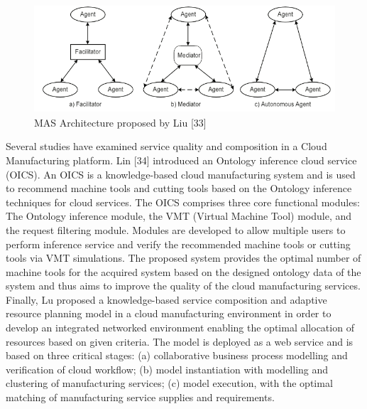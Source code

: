 \begin{figure}[h]
    \centering
    \includegraphics[height=4cm, keepaspectratio]{images/liu-mas-architecture}
    \caption{MAS Architecture proposed by Liu [33]}
    \label{fig:liu-mas-architecture}
\end{figure}

Several studies have examined service quality and composition in a Cloud Manufacturing platform. Lin [34] introduced an Ontology inference cloud service (OICS). An OICS is a knowledge-based cloud manufacturing system and is used to recommend machine tools and cutting tools based on the Ontology inference techniques for cloud services. The OICS comprises three core functional modules: The Ontology inference module, the VMT (Virtual Machine Tool) module, and the request filtering module. Modules are developed to allow multiple users to perform inference service and verify the recommended machine tools or cutting tools via VMT simulations. The proposed system provides the optimal number of machine tools for the acquired system based on the designed ontology data of the system and thus aims to improve the quality of the cloud manufacturing services.\\
Finally, Lu proposed a knowledge-based service composition and adaptive resource planning model in a cloud manufacturing environment in order to develop an integrated networked environment enabling the optimal allocation of resources based on given criteria. The model is deployed as a web service and is based on three critical stages: (a) collaborative business process modelling and verification of cloud workflow; (b) model instantiation with modelling and clustering of manufacturing services; (c) model execution, with the optimal matching of manufacturing service supplies and requirements.

